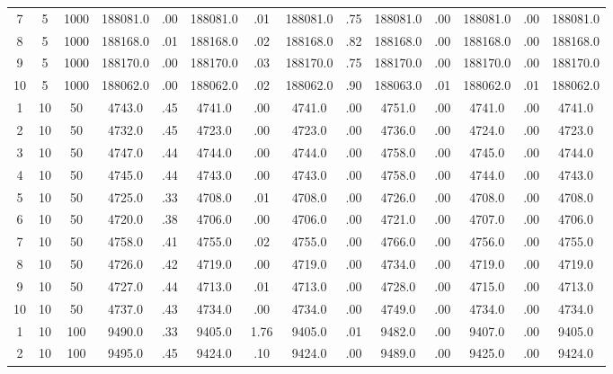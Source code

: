 \documentclass[12pt,a4paper]{article}
\begin{document}
\begin{center}
{\begin{tabular}{|ccc|cc|cc|cc|cc|cc|c|}
7             &   5&1000& 188081.0&  .00& 188081.0&  .01& 188081.0&  .75& 188081.0&  .00& 188081.0&  .00& 188081.0\\[-0.01in]
8             &   5&1000& 188168.0&  .01& 188168.0&  .02& 188168.0&  .82& 188168.0&  .00& 188168.0&  .00& 188168.0\\[-0.01in]
9             &   5&1000& 188170.0&  .00& 188170.0&  .03& 188170.0&  .75& 188170.0&  .00& 188170.0&  .00& 188170.0\\[-0.01in]
10            &   5&1000& 188062.0&  .00& 188062.0&  .02& 188062.0&  .90& 188063.0&  .01& 188062.0&  .01& 188062.0\\[-0.01in]
1             &  10&  50&   4743.0&  .45&   4741.0&  .00&   4741.0&  .00&   4751.0&  .00&   4741.0&  .00&   4741.0\\[-0.01in]
2             &  10&  50&   4732.0&  .45&   4723.0&  .00&   4723.0&  .00&   4736.0&  .00&   4724.0&  .00&   4723.0\\[-0.01in]
3             &  10&  50&   4747.0&  .44&   4744.0&  .00&   4744.0&  .00&   4758.0&  .00&   4745.0&  .00&   4744.0\\[-0.01in]
4             &  10&  50&   4745.0&  .44&   4743.0&  .00&   4743.0&  .00&   4758.0&  .00&   4744.0&  .00&   4743.0\\[-0.01in]
5             &  10&  50&   4725.0&  .33&   4708.0&  .01&   4708.0&  .00&   4726.0&  .00&   4708.0&  .00&   4708.0\\[-0.01in]
6             &  10&  50&   4720.0&  .38&   4706.0&  .00&   4706.0&  .00&   4721.0&  .00&   4707.0&  .00&   4706.0\\[-0.01in]
7             &  10&  50&   4758.0&  .41&   4755.0&  .02&   4755.0&  .00&   4766.0&  .00&   4756.0&  .00&   4755.0\\[-0.01in]
8             &  10&  50&   4726.0&  .42&   4719.0&  .00&   4719.0&  .00&   4734.0&  .00&   4719.0&  .00&   4719.0\\[-0.01in]
9             &  10&  50&   4727.0&  .44&   4713.0&  .01&   4713.0&  .00&   4728.0&  .00&   4715.0&  .00&   4713.0\\[-0.01in]
10            &  10&  50&   4737.0&  .43&   4734.0&  .00&   4734.0&  .00&   4749.0&  .00&   4734.0&  .00&   4734.0\\[-0.01in]
1             &  10& 100&   9490.0&  .33&   9405.0& 1.76&   9405.0&  .01&   9482.0&  .00&   9407.0&  .00&   9405.0\\[-0.01in]
2             &  10& 100&   9495.0&  .45&   9424.0&  .10&   9424.0&  .00&   9489.0&  .00&   9425.0&  .00&   9424.0\\[-0.01in]

\end{tabular}}
\end{center}
\end{document}
